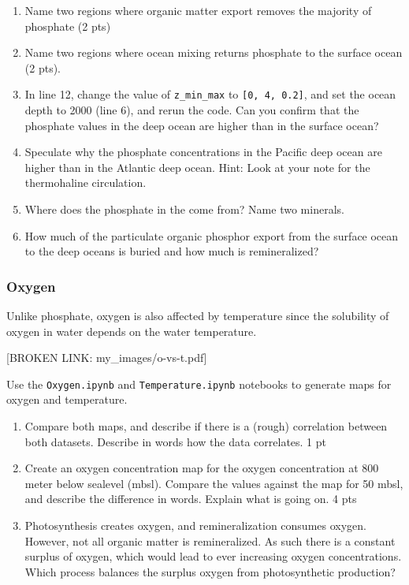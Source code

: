 \documentclass[11pt]{article}
\begin{document}
\begin{enumerate}
\item Name two regions where organic matter export removes the majority of phosphate (2 pts)
\item Name two regions where ocean mixing returns phosphate to the surface ocean (2 pts).
\item In line 12, change the value of \texttt{z\_min\_max} to \texttt{[0, 4, 0.2]}, and set the ocean depth to 2000 (line 6), and rerun the code.  Can you confirm that the phosphate values in the deep ocean are higher than in the surface ocean?
\item Speculate why the phosphate concentrations in the Pacific deep ocean are higher than in the Atlantic deep ocean. Hint: Look at your note for the thermohaline circulation.
\item Where does the phosphate in the come from? Name two minerals.
\item How much of the particulate organic phosphor export from the surface ocean to the deep oceans is buried and how much is remineralized?
\end{enumerate}

\subsubsection{Oxygen}
\label{sec:org3867446}

Unlike phosphate, oxygen is also affected by temperature since the solubility of oxygen in water depends on the water temperature. 

[BROKEN LINK: my\_images/o-vs-t.pdf]

Use the \texttt{Oxygen.ipynb} and \texttt{Temperature.ipynb} notebooks to generate maps for oxygen and temperature. 

\begin{enumerate}
\item Compare both maps, and describe if there is a (rough) correlation between both datasets. Describe in words how the data correlates. 1 pt
\item Create an oxygen concentration map for the oxygen concentration at 800 meter below sealevel (mbsl). Compare the values against the map for 50 mbsl, and describe the difference in words. Explain what is going on. 4 pts
\item Photosynthesis creates oxygen, and remineralization consumes oxygen. However, not all organic matter is remineralized. As such there is a constant surplus of oxygen, which would lead to ever increasing oxygen concentrations. Which process balances the surplus oxygen from photosynthetic production?
\end{enumerate}
\end{document}
